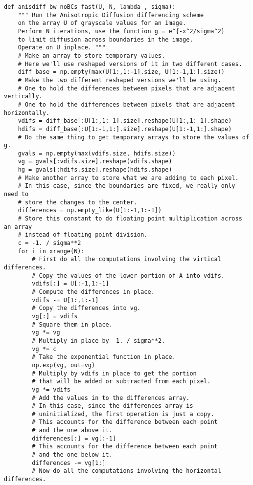 \begin{lstlisting}
def anisdiff_bw_noBCs_fast(U, N, lambda_, sigma):
    """ Run the Anisotropic Diffusion differencing scheme
    on the array U of grayscale values for an image.
    Perform N iterations, use the function g = e^{-x^2/sigma^2}
    to limit diffusion across boundaries in the image.
    Operate on U inplace. """
    # Make an array to store temporary values.
    # Here we'll use reshaped versions of it in two different cases.
    diff_base = np.empty(max(U[1:,1:-1].size, U[1:-1,1:].size))
    # Make the two different reshaped versions we'll be using.
    # One to hold the differences between pixels that are adjacent vertically.
    # One to hold the differences between pixels that are adjacent horizontally.
    vdifs = diff_base[:U[1:,1:-1].size].reshape(U[1:,1:-1].shape)
    hdifs = diff_base[:U[1:-1,1:].size].reshape(U[1:-1,1:].shape)
    # Do the same thing to get temporary arrays to store the values of g.
    gvals = np.empty(max(vdifs.size, hdifs.size))
    vg = gvals[:vdifs.size].reshape(vdifs.shape)
    hg = gvals[:hdifs.size].reshape(hdifs.shape)
    # Make another array to store what we are adding to each pixel.
    # In this case, since the boundaries are fixed, we really only need to
    # store the changes to the center.
    differences = np.empty_like(U[1:-1,1:-1])
    # Store this constant to do floating point multiplication across an array
    # instead of floating point division.
    c = -1. / sigma**2
    for i in xrange(N):
        # First do all the computations involving the virtical differences.
        # Copy the values of the lower portion of A into vdifs.
        vdifs[:] = U[:-1,1:-1]
        # Compute the differences in place.
        vdifs -= U[1:,1:-1]
        # Copy the differences into vg.
        vg[:] = vdifs
        # Square them in place.
        vg *= vg
        # Multiply in place by -1. / sigma**2.
        vg *= c
        # Take the exponential function in place.
        np.exp(vg, out=vg)
        # Multiply by vdifs in place to get the portion
        # that will be added or subtracted from each pixel.
        vg *= vdifs
        # Add the values in to the differences array.
        # In this case, since the differences array is
        # uninitialized, the first operation is just a copy.
        # This accounts for the difference between each point
        # and the one above it.
        differences[:] = vg[:-1]
        # This accounts for the difference between each point
        # and the one below it.
        differences -= vg[1:]
        # Now do all the computations involving the horizontal differences.

\end{lstlisting}
